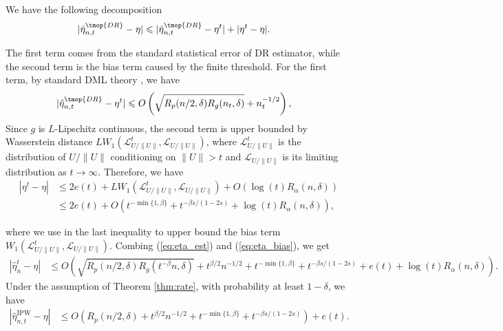   We have the following decomposition
  \begin{align*}
    | \hat{\eta}_{n, t}^{\tmop{DR}} - \eta | & \leqslant | \hat{\eta}_{n,
    t}^{\tmop{DR}} - \eta^t | + | \eta^t - \eta |.
  \end{align*}
  
  The first term comes from the standard statistical error of DR estimator, while the second term is the bias term caused by the finite threshold. For the first term, by standard DML theory {\citep{foster2023orthogonal}},
  we have
  \begin{align*}
    | \hat{\eta}_{n, t}^{\tmop{DR}} - \eta^t | & \leqslant O \left( \sqrt{R_p
    (n/2, \delta) R_g (n_t, \delta)} + n_t^{- 1 / 2} \right),
  \end{align*}
  Since $g$ is $L$-Lipschitz continuous, the second term is upper bounded by
  Wasserstein distance $LW_1 (\mathcal{L}_{U /\|U\|}^t, \mathcal{L}_{U
  /\|U\|})$, where $\mathcal{L}_{U /\|U\|}^t$ is the distribution of $U
  /\|U\|$ conditioning on $\|U\|> t$ and $\mathcal{L}_{U /\|U\|}$ is its
  limiting distribution as $t \rightarrow \infty$. Therefore, we have
  \begin{align}
    | \eta^t - \eta | & \leqslant 2 e (t) + LW_1 (\mathcal{L}_{U /\|U\|}^t,
    \mathcal{L}_{U /\|U\|}) + O (\log (t) R_{\alpha} (n, \delta)) \nonumber\\
    & \leqslant 2 e (t) + O (t^{- \min \{1, \beta\}} + t^{- \beta s / (1 - 2
    s)} + \log (t) R_{\alpha} (n, \delta)),  \label{eq:eta_bias}
  \end{align}
  
  where we use {\citetext{\citealp{zhang2023wasserstein},  Proposition 3.1}}
  in the last inequality to upper bound the bias term $W_1 (\mathcal{L}_{U
  /\|U\|}^t, \mathcal{L}_{U /\|U\|})$. Combing (\ref{eq:eta_est}) and
  (\ref{eq:eta_bias}), we get
  \begin{align*}
    | \hat{\eta}_n^{t} - \eta | & \leqslant O (\sqrt{R_p (n/2, \delta) R_g
    (t^{- \beta} n, \delta)} + t^{\beta / 2} n^{- 1 / 2} + t^{- \min \{1,
    \beta\}} + t^{- \beta s / (1 - 2 s)} + e (t) + \log (t) R_{\alpha} (n,\delta)) .
  \end{align*}
  Under the assumption of Theorem \ref{thm:rate}, with probability at least $1
  - \delta$, we have
\begin{align*}
    | \hat{\eta}_{n, t}^{\text{IPW}} - \eta | & \leqslant O (R_p (n/2, \delta) +
    t^{\beta / 2} n^{- 1 / 2} + t^{- \min \{1, \beta\}} + t^{- \beta s / (1 -
    2 s)}) + e (t) .
  \end{align*}

